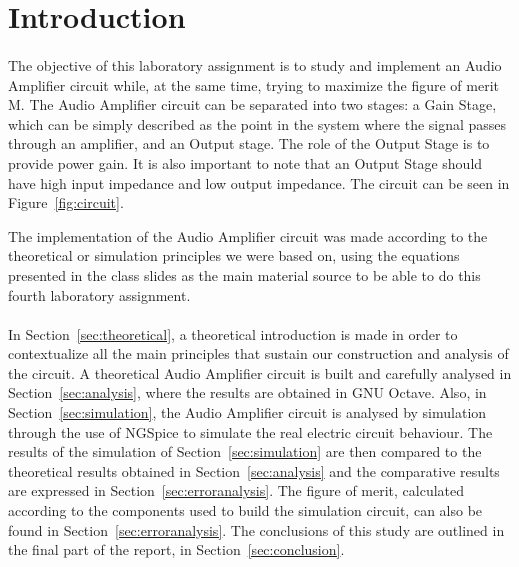 \pagebreak

\section{Introduction}
\label{sec:introduction}

\paragraph{} 
The objective of this laboratory assignment is to study and implement an Audio Amplifier circuit while, at the same time, trying to maximize the figure of merit M. The Audio Amplifier circuit can be separated into two stages: a Gain Stage, which can be simply described as the point in the system where the signal passes through an amplifier, and an Output stage. The role of the Output Stage is to provide power gain. It is also important to note that an Output Stage should have high input impedance and low output impedance. The circuit can be seen in Figure~\ref{fig:circuit}.


The implementation of the Audio Amplifier circuit was made according to the theoretical or simulation principles we were based on, using the equations presented in the class slides as the main material source to be able to do this fourth laboratory assignment.



\paragraph{}
In Section~\ref{sec:theoretical}, a theoretical introduction is made in order to contextualize all the main principles that sustain our construction and analysis of the circuit. A theoretical Audio Amplifier circuit is built and carefully analysed in Section~\ref{sec:analysis}, where the results are obtained in GNU Octave. Also, in Section~\ref{sec:simulation}, the Audio Amplifier circuit is analysed by simulation through the use of NGSpice to simulate the real electric circuit behaviour. The results of the simulation of Section~\ref{sec:simulation} are then compared to the theoretical results obtained in Section~\ref{sec:analysis} and the comparative results are expressed in Section~\ref{sec:erroranalysis}. The figure of merit, calculated according to the components used to build the simulation circuit, can also be found in Section~\ref{sec:erroranalysis}. The conclusions of this study are outlined in the final part of the report, in Section~\ref{sec:conclusion}.


